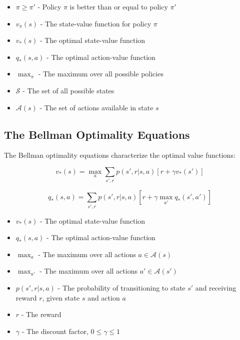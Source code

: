 \documentclass[12pt,a4paper]{article}
\begin{document}
\begin{tcolorbox}[title=Notation Overview]
\begin{itemize}
    \item $\pi \geq \pi'$ - Policy $\pi$ is better than or equal to policy $\pi'$
    \item $v_{\pi}(s)$ - The state-value function for policy $\pi$
    \item $v_*(s)$ - The optimal state-value function
    \item $q_*(s,a)$ - The optimal action-value function
    \item $\max_{\pi}$ - The maximum over all possible policies
    \item $\mathcal{S}$ - The set of all possible states
    \item $\mathcal{A}(s)$ - The set of actions available in state $s$
\end{itemize}
\end{tcolorbox}

\subsection{The Bellman Optimality Equations}

The Bellman optimality equations characterize the optimal value functions:

\begin{equation}
v_*(s) = \max_a \sum_{s',r} p(s',r|s,a) [r + \gamma v_*(s')]
\end{equation}

\begin{equation}
q_*(s,a) = \sum_{s',r} p(s',r|s,a) [r + \gamma \max_{a'} q_*(s',a')]
\end{equation}

\begin{tcolorbox}[title=Notation Overview]
\begin{itemize}
    \item $v_*(s)$ - The optimal state-value function
    \item $q_*(s,a)$ - The optimal action-value function
    \item $\max_a$ - The maximum over all actions $a \in \mathcal{A}(s)$
    \item $\max_{a'}$ - The maximum over all actions $a' \in \mathcal{A}(s')$
    \item $p(s',r|s,a)$ - The probability of transitioning to state $s'$ and receiving reward $r$, given state $s$ and action $a$
    \item $r$ - The reward
    \item $\gamma$ - The discount factor, $0 \leq \gamma \leq 1$
\end{itemize}
\end{tcolorbox}
\end{document}
